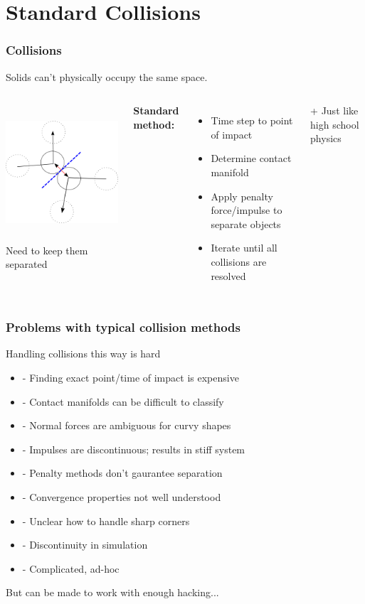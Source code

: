 \documentclass{beamer}
\begin{document}
\section{Standard Collisions}
\begin{frame}
\frametitle{Collisions}
Solids can't physically occupy the same space.
\vskip10pt
\begin{columns}
		\includegraphics[height=2in]{figures/collision.png}
		\vskip5pt
		Need to keep them separated
		
	\pause
	
	{\bf Standard method:}
	
	\begin{itemize}
	\item Time step to point of impact
	\pause
	\item Determine contact manifold
	\pause
	\item Apply penalty force/impulse to separate objects
	\pause
	\item Iterate until all collisions are resolved
	\end{itemize}
	\pause
	\vskip5pt
	+ Just like high school physics
	
\end{columns}
\end{frame}


\begin{frame}
\frametitle{Problems with typical collision methods}
Handling collisions this way is hard
\vskip5pt
\pause
\begin{itemize}
\item{-} Finding exact point/time of impact is expensive
\item{-} Contact manifolds can be difficult to classify
\item{-} Normal forces are ambiguous for curvy shapes
\item{-} Impulses are discontinuous; results in stiff system
\item{-} Penalty methods don't gaurantee separation
\item{-} Convergence properties not well understood
\item{-} Unclear how to handle sharp corners
\item{-} Discontinuity in simulation
\item{-} Complicated, ad-hoc
\end{itemize}
\pause
But can be made to work with enough hacking...
\end{frame}
\end{document}

